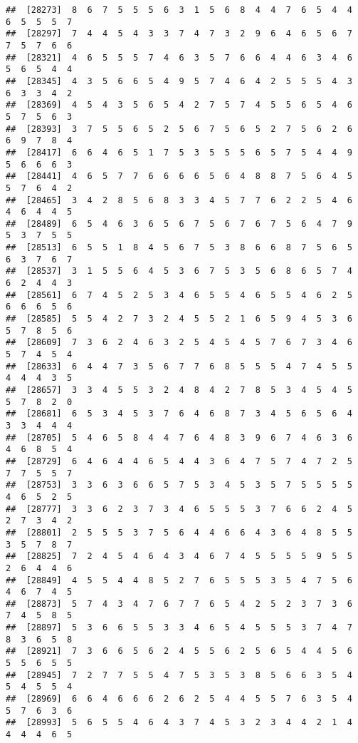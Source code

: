 \documentclass[
]{book}
\begin{document}
\begin{verbatim}
##  [28273]  8  6  7  5  5  5  6  3  1  5  6  8  4  4  7  6  5  4  4  6  5  5  5  7
##  [28297]  7  4  4  5  4  3  3  7  4  7  3  2  9  6  4  6  5  6  7  7  5  7  6  6
##  [28321]  4  6  5  5  5  7  4  6  3  5  7  6  6  4  4  6  3  4  6  5  6  5  4  4
##  [28345]  4  3  5  6  6  5  4  9  5  7  4  6  4  2  5  5  5  4  3  6  3  3  4  2
##  [28369]  4  5  4  3  5  6  5  4  2  7  5  7  4  5  5  6  5  4  6  5  7  5  6  3
##  [28393]  3  7  5  5  6  5  2  5  6  7  5  6  5  2  7  5  6  2  6  6  9  7  8  4
##  [28417]  6  6  4  6  5  1  7  5  3  5  5  5  6  5  7  5  4  4  9  5  6  6  6  3
##  [28441]  4  6  5  7  7  6  6  6  6  5  6  4  8  8  7  5  6  4  5  5  7  6  4  2
##  [28465]  3  4  2  8  5  6  8  3  3  4  5  7  7  6  2  2  5  4  6  4  6  4  4  5
##  [28489]  6  5  4  6  3  6  5  6  7  5  6  7  6  7  5  6  4  7  9  5  3  7  5  5
##  [28513]  6  5  5  1  8  4  5  6  7  5  3  8  6  6  8  7  5  6  5  6  3  7  6  7
##  [28537]  3  1  5  5  6  4  5  3  6  7  5  3  5  6  8  6  5  7  4  6  2  4  4  3
##  [28561]  6  7  4  5  2  5  3  4  6  5  5  4  6  5  5  4  6  2  5  6  6  6  5  6
##  [28585]  5  5  4  2  7  3  2  4  5  5  2  1  6  5  9  4  5  3  6  5  7  8  5  6
##  [28609]  7  3  6  2  4  6  3  2  5  4  5  4  5  7  6  7  3  4  6  5  7  4  5  4
##  [28633]  6  4  4  7  3  5  6  7  7  6  8  5  5  5  4  7  4  5  5  4  4  4  3  5
##  [28657]  3  3  4  5  5  3  2  4  8  4  2  7  8  5  3  4  5  4  5  5  7  8  2  0
##  [28681]  6  5  3  4  5  3  7  6  4  6  8  7  3  4  5  6  5  6  4  3  3  4  4  4
##  [28705]  5  4  6  5  8  4  4  7  6  4  8  3  9  6  7  4  6  3  6  4  6  8  5  4
##  [28729]  6  4  6  4  4  6  5  4  4  3  6  4  7  5  7  4  7  2  5  7  7  5  5  7
##  [28753]  3  3  6  3  6  6  5  7  5  3  4  5  3  5  7  5  5  5  5  4  6  5  2  5
##  [28777]  3  3  6  2  3  7  3  4  6  5  5  5  3  7  6  6  2  4  5  2  7  3  4  2
##  [28801]  2  5  5  5  3  7  5  6  4  4  6  6  4  3  6  4  8  5  5  3  5  7  8  7
##  [28825]  7  2  4  5  4  6  4  3  4  6  7  4  5  5  5  5  9  5  5  2  6  4  4  6
##  [28849]  4  5  5  4  4  8  5  2  7  6  5  5  5  3  5  4  7  5  6  4  6  7  4  5
##  [28873]  5  7  4  3  4  7  6  7  7  6  5  4  2  5  2  3  7  3  6  7  4  5  8  5
##  [28897]  5  3  6  6  5  5  3  3  4  6  5  4  5  5  5  3  7  4  7  8  3  6  5  8
##  [28921]  7  3  6  6  5  6  2  4  5  5  6  2  5  6  5  4  4  5  6  5  5  6  5  5
##  [28945]  7  2  7  7  5  5  4  7  5  3  5  3  8  5  6  6  3  5  4  5  4  5  5  4
##  [28969]  6  6  4  6  6  6  2  6  2  5  4  4  5  5  7  6  3  5  4  5  7  6  3  6
##  [28993]  5  6  5  5  4  6  4  3  7  4  5  3  2  3  4  4  2  1  4  4  4  4  6  5

\end{verbatim}
\end{document}
